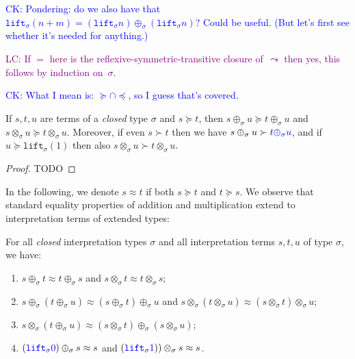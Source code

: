 \documentclass[runningheads,a4paper]{llncs}
\newcommand{\lift}{\mathtt{lift}}
\newcommand{\CK}[1]{\textcolor{blue}{CK: #1}}
\newcommand{\CKchange}[1]{\textcolor{blue}{#1}}
\newcommand{\LC}[1]{\textcolor{purple}{LC: #1}}
\begin{document}
\CK{Pondering: do we also have that
  $\lift_\sigma(n+m) = (\lift_\sigma n) \oplus_\sigma (\lift_\sigma
  n)$? Could be useful. (But let's first see whether it's needed for
  anything.)}

\LC{If $=$ here is the reflexive-symmetric-transitive closure
  of~$\leadsto$ then yes, this follows by induction on~$\sigma$.}

\CK{What I mean is: $\succeq \cap \preceq$, so I guess that's covered.}

\begin{lemma}\label{lem:plustimesmonotonic}
If $s,t,u$ are terms of a \emph{closed} type $\sigma$ and $s \succeq
t$, then $s \oplus_\sigma u \succeq t \oplus_\sigma u$ and $s
\otimes_\sigma u \succeq t \otimes_\sigma u$.  Moreover, if even $s
\succ t$ then we have $s \oplus_\sigma u \succ t \CKchange{\oplus_\sigma
u}$, and if $u \succeq
\lift_\sigma(1)$ then also $s \otimes_\sigma u \succ t \otimes_\sigma
u$.
\end{lemma}

\begin{proof}
TODO
\end{proof}

In the following, we denote $s \approx t$ if both $s \succeq t$ and
$t \succeq s$.  We observe that standard equality properties of
addition and multiplication extend to interpretation terms of extended
types:

\begin{lemma}\label{lem:approxproperties}
For all \emph{closed} interpretation types $\sigma$ and all
interpretation terms $s,t,u$ of type $\sigma$, we have:
\begin{enumerate}
\item\label{lem:approx:symmetry}
  $s \oplus_\sigma t \approx t \oplus_\sigma s$ and
  $s \otimes_\sigma t \approx t \otimes_\sigma s$;
\item\label{lem:approx:assoc} $s \oplus_\sigma (t \oplus_\sigma u)
  \approx (s \oplus_\sigma t) \oplus_\sigma u$ and $s
  \otimes_\sigma (t \otimes_\sigma u) \approx (s \otimes_\sigma t) \otimes_\sigma u$;
\item\label{lem:approx:distribution} $s \otimes_\sigma (t \oplus_\sigma u)
  \approx (s \otimes_\sigma t) \oplus_\sigma (s \otimes_\sigma u)$;
\item\label{lem:approx:neutral} $(\CKchange{\lift_\sigma 0}) \oplus_\sigma s
  \approx s$ and $(\CKchange{\lift_\sigma 1})) \otimes_\sigma s \approx s$.
\end{enumerate}
\end{lemma}
\end{document}
